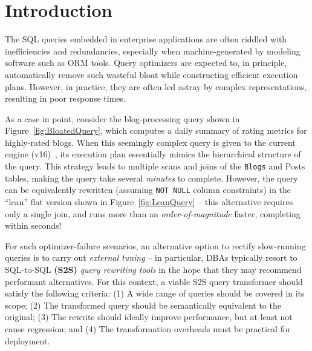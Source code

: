 \section{Introduction}
\label{sec:intro}

The SQL queries embedded in enterprise applications are often riddled with inefficiencies and redundancies, especially when machine-generated by modeling software such as ORM tools. Query optimizers are expected to, in principle, automatically remove such wasteful bloat while constructing efficient execution plans. However, in practice, they are often led astray by complex representations, resulting in poor response times. 



As a case in point, consider the blog-processing query
shown in Figure~\ref{fig:BloatedQuery},
which computes a daily summary of rating metrics for highly-rated blogs. When this seemingly complex query is given to the current \pg engine (v16)~\cite{pgsql}, its execution plan essentially mimics the hierarchical structure of the query. This strategy leads to multiple scans and joins of the {\tt Blogs} and {Posts} tables,
making the query take several \emph{minutes} to complete.  However, 
the query can be equivalently rewritten (assuming \texttt{NOT NULL} column constraints)
in the ``lean'' flat version shown in Figure~\ref{fig:LeanQuery} -- this alternative requires only a single join, and runs more than an \emph{order-of-magnitude} faster, completing within seconds!

For such optimizer-failure scenarios, an alternative option to rectify slow-running queries is to carry out \emph{external tuning} -- in particular, DBAs typically resort to SQL-to-SQL {\bf (S2S)} \emph{query rewriting tools} in the hope that they may recommend performant alternatives.
For this context, a viable S2S query transformer should satisfy the following criteria: (1) A wide range of queries should be covered in its scope; (2) The transformed query should be semantically equivalent to the original; (3) The rewrite should ideally improve performance, but at least not cause regression; and (4) The transformation overheads must be practical for deployment.

